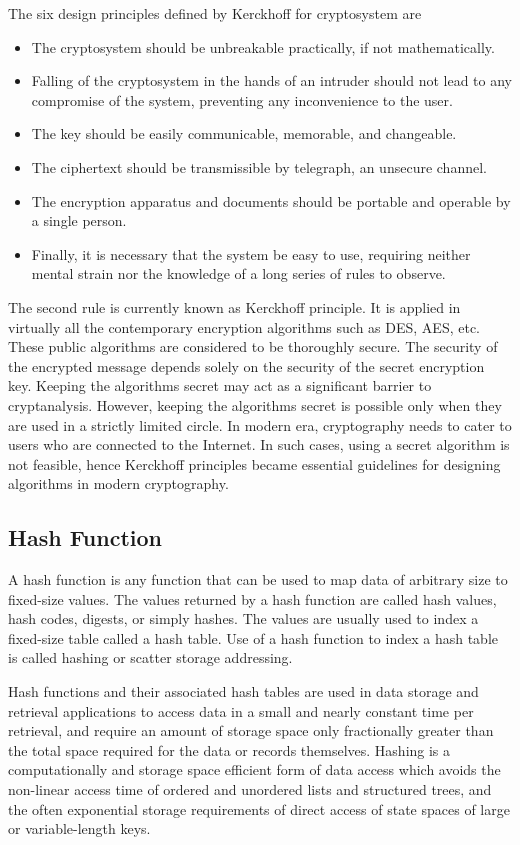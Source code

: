 \documentclass[british]{article}
\begin{document}
The six design principles defined by Kerckhoff for cryptosystem are
\textminus{}
\begin{itemize}
	\item The cryptosystem should be unbreakable practically, if not mathematically.
	\item Falling of the cryptosystem in the hands of an intruder should not
	      lead to any compromise of the system, preventing any inconvenience
	      to the user.
	\item The key should be easily communicable, memorable, and changeable.
	\item The ciphertext should be transmissible by telegraph, an unsecure channel.
	\item The encryption apparatus and documents should be portable and operable
	      by a single person.
	\item Finally, it is necessary that the system be easy to use, requiring
	      neither mental strain nor the knowledge of a long series of rules
	      to observe.
\end{itemize}
The second rule is currently known as Kerckhoff principle. It is applied
in virtually all the contemporary encryption algorithms such as DES,
AES, etc. These public algorithms are considered to be thoroughly
secure. The security of the encrypted message depends solely on the
security of the secret encryption key. Keeping the algorithms secret
may act as a significant barrier to cryptanalysis. However, keeping
the algorithms secret is possible only when they are used in a strictly
limited circle. In modern era, cryptography needs to cater to users
who are connected to the Internet. In such cases, using a secret algorithm
is not feasible, hence Kerckhoff principles became essential guidelines
for designing algorithms in modern cryptography.

\subsection{Hash Function}

A hash function is any function that can be used to map data of arbitrary
size to fixed-size values. The values returned by a hash function
are called hash values, hash codes, digests, or simply hashes. The
values are usually used to index a fixed-size table called a hash
table. Use of a hash function to index a hash table is called hashing
or scatter storage addressing.

Hash functions and their associated hash tables are used in data storage
and retrieval applications to access data in a small and nearly constant
time per retrieval, and require an amount of storage space only fractionally
greater than the total space required for the data or records themselves.
Hashing is a computationally and storage space efficient form of data
access which avoids the non-linear access time of ordered and unordered
lists and structured trees, and the often exponential storage requirements
of direct access of state spaces of large or variable-length keys.
\end{document}

